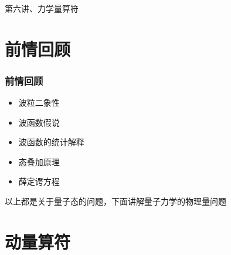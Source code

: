 \begin{frame}
    \frametitle{}
    \begin{center}
    { {\huge 第六讲、力学量算符}}
    \end{center}    
\end{frame}


\section{前情回顾}

\begin{frame}
    \frametitle{前情回顾}
    \begin{itemize}
        \item 波粒二象性
        \item 波函数假说
        \item 波函数的统计解释
        \item 态叠加原理
        \item 薛定谔方程
    \end{itemize}
    以上都是关于量子态的问题，下面讲解量子力学的物理量问题
\end{frame} 

\section{动量算符}


